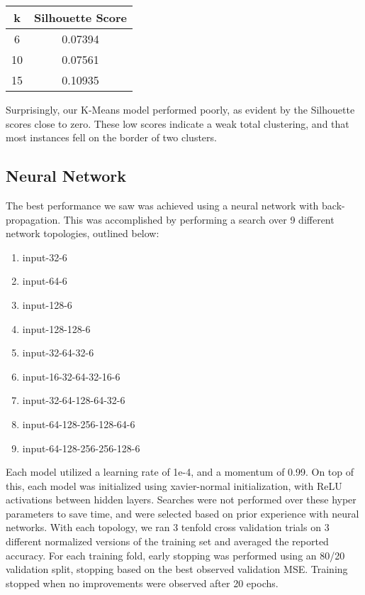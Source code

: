 \documentclass{article}
\begin{document}
\begin{center}
\begin{tabular}{c c}
\toprule
k & Silhouette Score\\
\midrule
6 & 0.07394\\
10 & 0.07561\\
15 & 0.10935\\
\bottomrule
\end{tabular}
\end{center}

Surprisingly, our K-Means model performed poorly, as evident by the Silhouette scores close to zero.
These low scores indicate a weak total clustering, and that most instances fell on the border of two clusters.

\subsection{Neural Network}

The best performance we saw was achieved using a neural network with back-propagation. This was accomplished by performing a search over 9 different network topologies, outlined below:

\begin{enumerate}
    \item input-32-6
    \item input-64-6
    \item input-128-6
    \item input-128-128-6
    \item input-32-64-32-6
    \item input-16-32-64-32-16-6
    \item input-32-64-128-64-32-6
    \item input-64-128-256-128-64-6
    \item input-64-128-256-256-128-6
\end{enumerate}

 Each model utilized a learning rate of 1e-4, and a momentum of 0.99. On top of this, each model was initialized using xavier-normal initialization, with ReLU activations between hidden layers. Searches were not performed over these hyper parameters to save time, and were selected based on prior experience with neural networks. With each topology, we ran 3 tenfold cross validation trials on 3 different normalized versions of the training set and averaged the reported accuracy. For each training fold, early stopping was performed using an 80/20 validation split, stopping based on the best observed validation MSE. Training stopped when no improvements were observed after 20 epochs.
\end{document}
